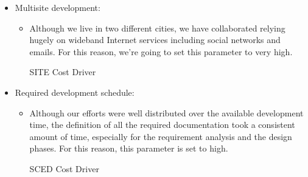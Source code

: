 \begin{itemize}
	\item Multisite development: 
	\begin{itemize}
	\item[] Although we live in two different cities, we have collaborated relying hugely on wideband Internet services including social networks and emails. For this reason, we're going to set this parameter to very high.
	\pagebreak
	\begin{costdriverstable}{SITE Cost Driver}
		\hline
	\end{costdriverstable}
	
	\end{itemize}
\end{itemize}

\begin{itemize}
	\item Required development schedule: 
	\begin{itemize}
	\item[] Although our efforts were well distributed over the available development time, the definition of all the required documentation took a consistent amount of time, especially for the requirement analysis and the design phases. For this reason, this parameter is set to high.
	\begin{costdriverstable}{SCED Cost Driver}
		\hline
	\end{costdriverstable}
	\end{itemize}
\end{itemize}



